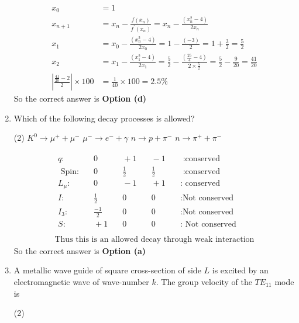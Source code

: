 \begin{enumerate}
\begin{answer}
\begin{align*}
	x_{0}&=1\\
	x_{n+1}&=x_{n}-\frac{f\left(x_{n}\right)}{f^{\prime}\left(x_{n}\right)}=x_{n}-\frac{\left(x_{n}^{2}-4\right)}{2 x_{n}} \\
	x_{1}&=x_{0}-\frac{\left(x_{n}^{2}-4\right)}{2 x_{0}}=1-\frac{(-3)}{2}=1+\frac{3}{2}=\frac{5}{2} \\
	x_{2}&=x_{1}-\frac{\left(x_{1}^{2}-4\right)}{2 x_{1}}=\frac{5}{2}-\frac{\left(\frac{25}{4}-4\right)}{2 \times \frac{5}{2}}=\frac{5}{2}-\frac{9}{20}=\frac{41}{20}\\
	\left|\frac{\frac{41}{20}-2}{2}\right| \times 100&=\frac{1}{40} \times 100=2.5 \%
	\end{align*}
	So the correct answer is \textbf{Option (d)}
\end{answer}
\item Which of the following decay processes is allowed?
 \begin{tasks}(2)
	\task[\textbf{a.}]$K^{0} \rightarrow \mu^{+}+\mu^{-}$
	\task[\textbf{b.}] $\mu^{-} \rightarrow e^{-}+\gamma$
	\task[\textbf{c.}]$n \rightarrow p+\pi^{-}$
	\task[\textbf{d.}] $n \rightarrow \pi^{+}+\pi^{-}$
\end{tasks}
\begin{answer}
	\begin{align*}
\begin{array}{lllll}
q: &\quad0 &\quad+1 &\quad-1 &\quad \text { :conserved }\\
\text { Spin:}&\quad 0 & \quad\frac{1}{2} &\quad \frac{1}{2} &\quad \text { :conserved }\\
L_{\mu}:& \quad 0 &\quad-1 &\quad+1 &\quad: \text { conserved }\\
I: &\quad \frac{1}{2} &\quad 0 &\quad 0 &\quad: \text{Not conserved}\\
I_{3}: &\quad \frac{-1}{2} &\quad 0 &\quad 0 &\quad: \text{Not conserved}\\
S: &\quad+1 &\quad 0 &\quad 0 &\quad: \text{ Not conserved}
\end{array}\\\\
\text{Thus this is an allowed decay through weak interaction}
	\end{align*}
		So the correct answer is \textbf{Option (a)}
\end{answer}
\item A metallic wave guide of square cross-section of side $L$ is excited by an electromagnetic wave of wave-number $k$. The group velocity of the $T E_{11}$ mode is
 \begin{tasks}(2)

\end{tasks}
\end{enumerate}
